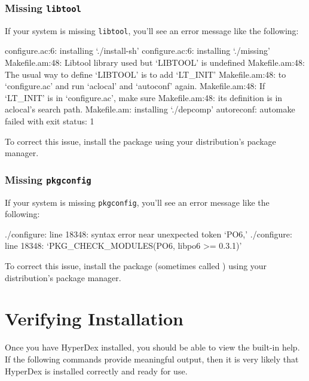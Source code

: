 \subsubsection{Missing \texttt{libtool}}
\label{sec:installation:troubleshooting:libtool}

If your system is missing \texttt{libtool}, you'll see an error message like the
following:

\begin{consolecode}
configure.ac:6: installing `./install-sh'
configure.ac:6: installing `./missing'
Makefile.am:48: Libtool library used but `LIBTOOL' is undefined
Makefile.am:48:   The usual way to define `LIBTOOL' is to add `LT_INIT'
Makefile.am:48:   to `configure.ac' and run `aclocal' and `autoconf' again.
Makefile.am:48:   If `LT_INIT' is in `configure.ac', make sure
Makefile.am:48:   its definition is in aclocal's search path.
Makefile.am: installing `./depcomp'
autoreconf: automake failed with exit status: 1
\end{consolecode}

To correct this issue, install the  package using your
distribution's package manager.

\subsubsection{Missing \texttt{pkgconfig}}
\label{sec:installation:troubleshooting:pkgconfig}

If your system is missing \texttt{pkgconfig}, you'll see an error message like
the following:

\begin{consolecode}
./configure: line 18348: syntax error near unexpected token `PO6,'
./configure: line 18348: `PKG_CHECK_MODULES(PO6, libpo6 >= 0.3.1)'
\end{consolecode}

To correct this issue, install the  package (sometimes called
) using your distribution's package manager.

\section{Verifying Installation}
\label{sec:installation:verify}

Once you have HyperDex installed, you should be able to view the built-in help.
If the following commands provide meaningful output, then it is very likely that
HyperDex is installed correctly and ready for use.

